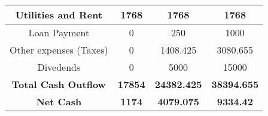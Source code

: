 \begin{table}[!H]
\begin{tabular}{|c|c|c|c|c|}
\multicolumn{2}{|c|}{\cellcolor[HTML]{23BAB3}Utilities and Rent}                                                    & 1768                                                          & 1768                                                               & 1768                                                               \\ \hline
\multicolumn{2}{|c|}{\cellcolor[HTML]{23BAB3}Loan Payment}                                                          & 0                                                             & 250                                                                & 1000                                                               \\ \hline
\multicolumn{2}{|c|}{\cellcolor[HTML]{23BAB3}Other expenses (Taxes)}                                                & 0                                                             & 1408.425                                                           & 3080.655                                                           \\ \hline
\multicolumn{2}{|c|}{\cellcolor[HTML]{23BAB3}Divedends}                                                             & 0                                                             & 5000                                                               & 15000                                                              \\ \hline
\multicolumn{2}{|c|}{\cellcolor[HTML]{23BAB3}\textbf{Total Cash Outflow}}                                           & \textbf{17854}                                                & \textbf{24382.425}                                                 & \textbf{38394.655}                                                 \\ \hline
\multicolumn{2}{|c|}{\cellcolor[HTML]{23BAB3}\textbf{Net Cash}}                                                     & \textbf{1174}                                                 & \textbf{4079.075}                                                  & \textbf{9334.42}                                                   \\ \hline
\end{tabular}
\end{table}

